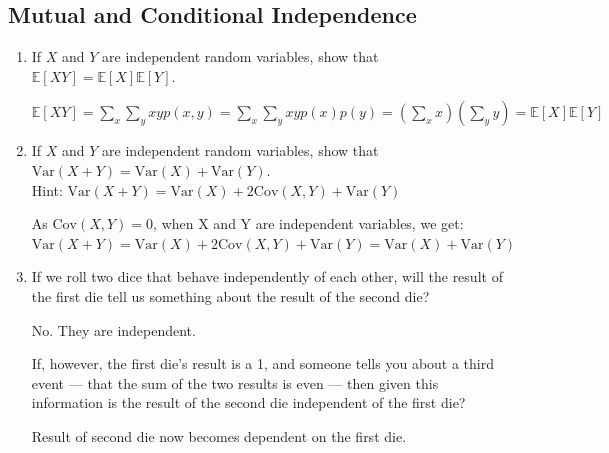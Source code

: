 \documentclass[a4paper]{article}
\theoremstyle{definition}
\newcommand{\Var}{\mathrm{Var}}
\newcommand{\Cov}{\mathrm{Cov}}
\newenvironment{soln}{
    \leavevmode\color{blue}\ignorespaces
}{}
\begin{document}
\subsection{Mutual and Conditional Independence}
\begin{enumerate}
\item If $X$ and $Y$ are independent random variables, show that
  $\mathbb{E}[XY] = \mathbb{E}[X]\mathbb{E}[Y]$.
  
  \begin{soln}
  	$\mathbb{E}[XY] = \sum_{x}\sum_{y} xyp(x,y) = \sum_{x}\sum_{y} xyp(x)p(y) = (\sum_{x} x)(\sum_{y} y) = \mathbb{E}[X]\mathbb{E}[Y]$
  \end{soln}
  
\item If $X$ and $Y$ are independent random variables, show that
  $\Var(X+Y) = \Var(X) + \Var(Y)$. \\
  Hint: $\Var(X+Y) = \Var(X) + 2\Cov(X, Y) + \Var(Y)$
  
  \begin{soln}  As $\Cov(X,Y) = 0$, when X and Y are independent variables, we get: 
  	 $\Var(X+Y) = \Var(X) + 2\Cov(X, Y) + \Var(Y) = \Var(X) + \Var(Y) $
   \end{soln}
 
\item If we roll two dice that behave independently of each
  other, will the result of the first die tell us something about the
  result of the second die? 
  
  \begin{soln}  No. They are independent. \end{soln}
  
  If, however, the first die's result is a 1,
  and someone tells you about a third event --- that the sum of the two
  results is even --- then given this information is the result of the second die
  independent of the first die? 
  
  \begin{soln}  Result of second die now becomes dependent on the first die. \end{soln}
\end{enumerate}
\end{document}
